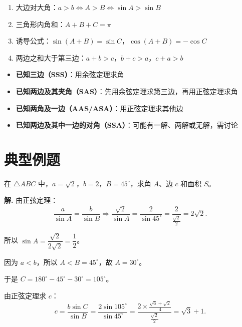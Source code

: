 \documentclass[11pt]{ctexrep}
\begin{document}
\begin{property}[三角形中的边角关系]
    \begin{enumerate}
        \item 大边对大角：$a > b \Leftrightarrow A > B \Leftrightarrow \sin A > \sin B$
        \item 三角形内角和：$A + B + C = \pi$
        \item 诱导公式：$\sin(A + B) = \sin C$，$\cos(A + B) = -\cos C$
        \item 两边之和大于第三边：$a + b > c$，$b + c > a$，$c + a > b$
    \end{enumerate}
\end{property}

\begin{property}[解三角形的类型]
    \begin{itemize}
        \item \textbf{已知三边（SSS）}：用余弦定理求角
        \item \textbf{已知两边及其夹角（SAS）}：先用余弦定理求第三边，再用正弦定理求角
        \item \textbf{已知两角及一边（AAS/ASA）}：用正弦定理求其他边
        \item \textbf{已知两边及其中一边的对角（SSA）}：可能有一解、两解或无解，需讨论
    \end{itemize}
\end{property}

\section*{典型例题}

\begin{example}[正弦定理的应用]
    在 $\triangle ABC$ 中，$a = \sqrt{2}$，$b = 2$，$B = 45^{\circ}$，求角 $A$、边 $c$ 和面积 $S$。
\end{example}

\textbf{解.} 由正弦定理：
\[
    \frac{a}{\sin A} = \frac{b}{\sin B} \Rightarrow \frac{\sqrt{2}}{\sin A} = \frac{2}{\sin 45^{\circ}} = \frac{2}{\frac{\sqrt{2}}{2}} = 2\sqrt{2}.
\]

所以 $\sin A = \dfrac{\sqrt{2}}{2\sqrt{2}} = \dfrac{1}{2}$。

因为 $a < b$，所以 $A < B = 45^{\circ}$，故 $A = 30^{\circ}$。

于是 $C = 180^{\circ} - 45^{\circ} - 30^{\circ} = 105^{\circ}$。

由正弦定理求 $c$：
\[
    c = \frac{b\sin C}{\sin B} = \frac{2\sin 105^{\circ}}{\sin 45^{\circ}} = \frac{2 \times \frac{\sqrt{6} + \sqrt{2}}{4}}{\frac{\sqrt{2}}{2}} = \sqrt{3} + 1.
\]
\end{document}
